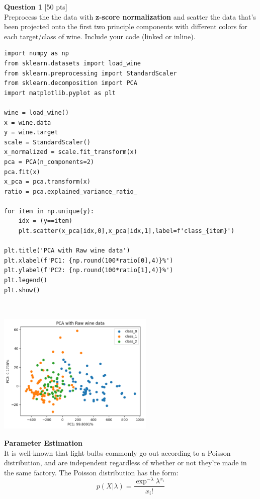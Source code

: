\documentclass[paper=a4, fontsize=11pt]{scrartcl} %
\author{
    \textbf{YOUR NAME} \\ 
    \textbf{YOUR GIT USERNAME} \\ 
    \textbf{YOUR E-MAIL}
}%
\begin{document}
\maketitle %

\vspace{5mm}
{\Large \textbf{Question 1} [50 pts]} \\

Preprocess the the data with \textbf{z-score normalization} and scatter the data that's been projected onto the first two principle components with different colors for each target/class of wine. Include your code (linked or inline).\\
\begin{verbatim}
import numpy as np
from sklearn.datasets import load_wine
from sklearn.preprocessing import StandardScaler
from sklearn.decomposition import PCA
import matplotlib.pyplot as plt

wine = load_wine()
x = wine.data
y = wine.target
scale = StandardScaler()
x_normalized = scale.fit_transform(x)
pca = PCA(n_components=2)
pca.fit(x)
x_pca = pca.transform(x)
ratio = pca.explained_variance_ratio_

for item in np.unique(y):
    idx = (y==item)
    plt.scatter(x_pca[idx,0],x_pca[idx,1],label=f'class_{item}')

plt.title('PCA with Raw wine data')
plt.xlabel(f'PC1: {np.round(100*ratio[0],4)}%')
plt.ylabel(f'PC2: {np.round(100*ratio[1],4)}%')
plt.legend()
plt.show()
\end{verbatim} \\


\begin{center}
    \includegraphics[width=75mm]{images/pca.png}
\end{center}

{\huge \textbf{Parameter Estimation}} \\

It is well-known that light bulbs commonly go out according to a Poisson distribution, and are independent regardless of whether or not they're made in the same factory. The Poisson distribution has the form: \\
\begin{equation}
p(X | \lambda) = \frac{ \exp^{-\lambda} \lambda ^{x_i}}{ x_i !} \nonumber
\end{equation} \\
\end{document}
